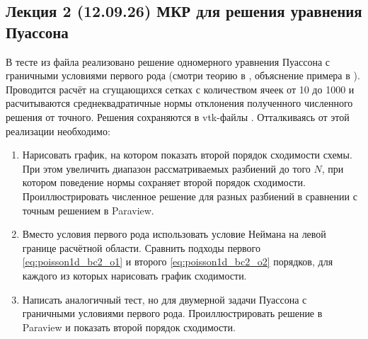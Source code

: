 \subsection{Лекция 2 (12.09.26) МКР для решения уравнения Пуассона}
В тесте  из файла 
реализовано решение одномерного уравнения Пуассона с граничными условиями первого рода
(смотри теорию в , объяснение примера в ).
Проводится расчёт на сгущающихся сетках с количеством ячеек от 10 до 1000
и расчитываются среднеквадратичные нормы отклонения полученного численного решения от точного.
Решения сохраняются в vtk-файлы .
Отталкиваясь от этой реализации необходимо:
\begin{enumerate}
\item Нарисовать график, на котором показать второй порядок сходимости схемы. При этом 
      увеличить диапазон рассматриваемых разбиений до того $N$, при котором поведение нормы сохраняет второй порядок сходимости.
      Проиллюстрировать численное решение для разных разбиений в сравнении с точным решением в Paraview.
\item Вместо условия первого рода использовать условие Неймана на левой границе расчётной области.
      Сравнить подходы первого \cref{eq:poisson1d_bc2_o1} и второго \cref{eq:poisson1d_bc2_o2} порядков,
      для каждого из которых нарисовать график сходимости.
\item Написать аналогичный тест, но для двумерной задачи Пуассона с граничными условиями первого рода.
      Проиллюстрировать решение в Paraview и показать второй порядок сходимости.
\end{enumerate}


